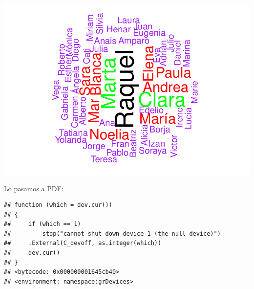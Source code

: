 \documentclass[]{article}
\newenvironment{Shaded}{\begin{snugshade}}{\end{snugshade}}
\newcommand{\DataTypeTok}[1]{\textcolor[rgb]{0.13,0.29,0.53}{#1}}
\newcommand{\DecValTok}[1]{\textcolor[rgb]{0.00,0.00,0.81}{#1}}
\newcommand{\FloatTok}[1]{\textcolor[rgb]{0.00,0.00,0.81}{#1}}
\newcommand{\KeywordTok}[1]{\textcolor[rgb]{0.13,0.29,0.53}{\textbf{#1}}}
\newcommand{\NormalTok}[1]{#1}
\newcommand{\OperatorTok}[1]{\textcolor[rgb]{0.81,0.36,0.00}{\textbf{#1}}}
\newcommand{\OtherTok}[1]{\textcolor[rgb]{0.56,0.35,0.01}{#1}}
\newcommand{\StringTok}[1]{\textcolor[rgb]{0.31,0.60,0.02}{#1}}
\begin{document}
\includegraphics{codigo_files/figure-latex/wordcloud-1.pdf}

Lo pasamos a PDF:

\begin{Shaded}
\end{Shaded}

\begin{verbatim}
## function (which = dev.cur()) 
## {
##     if (which == 1) 
##         stop("cannot shut down device 1 (the null device)")
##     .External(C_devoff, as.integer(which))
##     dev.cur()
## }
## <bytecode: 0x000000001645cb40>
## <environment: namespace:grDevices>
\end{verbatim}
\end{document}
